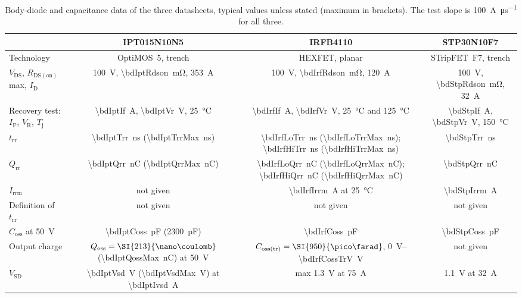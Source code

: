 \documentclass[10pt,a4paper]{scrartcl}
\newcommand{\IF}{I_\mathrm{F}}
\newcommand{\VR}{V_\mathrm{R}}
\newcommand{\Irrm}{I_\mathrm{rrm}}
\newcommand{\Qrr}{Q_\mathrm{rr}}
\newcommand{\Qoss}{Q_\mathrm{oss}}
\newcommand{\Coss}{C_\mathrm{oss}}
\newcommand{\trr}{t_\mathrm{rr}}
\newcommand{\Rds}{R_\mathrm{DS(on)}}
\newcommand{\VSD}{V_\mathrm{SD}}
\newcommand{\VDS}{V_\mathrm{DS}}
\newcommand{\Tj}{T_\mathrm{j}}
\newcommand{\IPT}{IPT015N10N5}
\newcommand{\IRF}{IRFB4110}
\newcommand{\STP}{STP30N10F7}
\begin{document}
\begin{table}[htb]
\centering\small
\caption{Body-diode and capacitance data of the three datasheets, typical values unless stated (maximum in brackets). The test slope is \SI{100}{\ampere\per\micro\second} for all three.}
\label{tab:data}
\begin{tabular}{@{}lccc@{}}
\toprule
 & \IPT{} \cite{ipt} & \IRF{} \cite{irf} & \STP{} \cite{stp} \\
\midrule
Technology & OptiMOS~5, trench & HEXFET, planar & STripFET~F7, trench \\
$\VDS$, $\Rds$ max, $I_\mathrm{D}$ & \SI{100}{\volt}, \SI{\bdIptRdson}{\milli\ohm}, \SI{353}{\ampere} & \SI{100}{\volt}, \SI{\bdIrfRdson}{\milli\ohm}, \SI{120}{\ampere} & \SI{100}{\volt}, \SI{\bdStpRdson}{\milli\ohm}, \SI{32}{\ampere} \\
Recovery test: $\IF$, $\VR$, $\Tj$ & \SI{\bdIptIf}{\ampere}, \SI{\bdIptVr}{\volt}, \SI{25}{\celsius} & \SI{\bdIrfIf}{\ampere}, \SI{\bdIrfVr}{\volt}, \SI{25}{\celsius} and \SI{125}{\celsius} & \SI{\bdStpIf}{\ampere}, \SI{\bdStpVr}{\volt}, \SI{150}{\celsius} \\
$\trr$ & \SI{\bdIptTrr}{\nano\second} (\SI{\bdIptTrrMax}{\nano\second}) & \SI{\bdIrfLoTrr}{\nano\second} (\SI{\bdIrfLoTrrMax}{\nano\second}); \SI{\bdIrfHiTrr}{\nano\second} (\SI{\bdIrfHiTrrMax}{\nano\second}) & \SI{\bdStpTrr}{\nano\second} \\
$\Qrr$ & \SI{\bdIptQrr}{\nano\coulomb} (\SI{\bdIptQrrMax}{\nano\coulomb}) & \SI{\bdIrfLoQrr}{\nano\coulomb} (\SI{\bdIrfLoQrrMax}{\nano\coulomb}); \SI{\bdIrfHiQrr}{\nano\coulomb} (\SI{\bdIrfHiQrrMax}{\nano\coulomb}) & \SI{\bdStpQrr}{\nano\coulomb} \\
$\Irrm$ & not given & \SI{\bdIrfIrrm}{\ampere} at \SI{25}{\celsius} & \SI{\bdStpIrrm}{\ampere} \\
Definition of $\trr$ & not given & not given & not given \\
$\Coss$ at \SI{50}{\volt} & \SI{\bdIptCoss}{\pico\farad} (\SI{2300}{\pico\farad}) & \SI{\bdIrfCoss}{\pico\farad} & \SI{\bdStpCoss}{\pico\farad} \\
Output charge & $\Qoss = \SI{\bdIptQoss}{\nano\coulomb}$ (\SI{\bdIptQossMax}{\nano\coulomb}) at \SI{50}{\volt} & $C_\mathrm{oss(tr)} = \SI{\bdIrfCossTr}{\pico\farad}$, \SIrange{0}{\bdIrfCossTrV}{\volt} & not given \\
$\VSD$ & \SI{\bdIptVsd}{\volt} (\SI{\bdIptVsdMax}{\volt}) at \SI{\bdIptIvsd}{\ampere} & max \SI{1.3}{\volt} at \SI{75}{\ampere} & \SI{1.1}{\volt} at \SI{32}{\ampere} \\
\bottomrule
\end{tabular}
\end{table}
\end{document}
